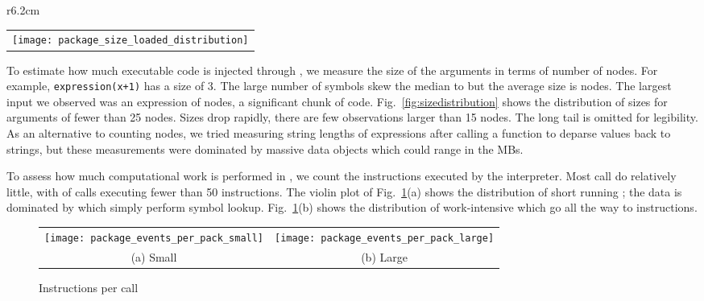 \documentclass[screen,acmsmall]{acmart}%
\renewcommand{\k}[1]{\lstinline |#1|\xspace}
\begin{document}
\begin{wrapfigure}{r}{6.2cm}
\begin{tabular}{c}
{\hspace{-25mm}\texttt{[image: package\_size\_loaded\_distribution]}}
\end{tabular}
\caption{Loaded code} \label{fig:sizedistribution}
\end{wrapfigure}

To estimate how much executable code is injected through \eval, we measure the
size of the arguments in terms of number of nodes. For example,
\k{expression(x+1)} has a size of 3. The large number of symbols skew the median
to \packageMedianszeval but the average size is \packageAvgszeval nodes. The
largest \eval input we observed was an expression of \packageMaxszeval nodes, a
significant chunk of code. Fig.~\ref{fig:sizedistribution} shows the
distribution of sizes for arguments of fewer than 25 nodes. Sizes drop rapidly,
there are few observations larger than 15 nodes. The long tail is omitted for
legibility. As an alternative to counting nodes, we tried measuring string
lengths of expressions after calling a function to deparse values back to
strings, but these measurements were dominated by massive data objects which
could range in the MBs.

To assess how much computational work is performed in \evals, we count the
instructions executed by the interpreter. Most call do relatively little, with
\packageSmalleventspct of calls executing fewer than 50 instructions. The violin
plot of Fig.~\ref{ev}(a) shows the distribution of short running \evals; the
data is dominated by \evals which simply perform symbol lookup. Fig.~\ref{ev}(b)
shows the distribution of work-intensive \evals which go all the way to
\packageMaxeventsRnd instructions.

\begin{figure}[h!]
\begin{tabular}{@{}c@{}c@{}}
\begin{minipage}{7.5cm}
 \texttt{[image: package\_events\_per\_pack\_small]}
\end{minipage}&\begin{minipage}{7.5cm}
  \texttt{[image: package\_events\_per\_pack\_large]}
\end{minipage}\\[-3mm]
\small (a) Small & \small (b) Large
\end{tabular}
 \caption{Instructions per call} \label{ev}
\end{figure}
\end{document}
